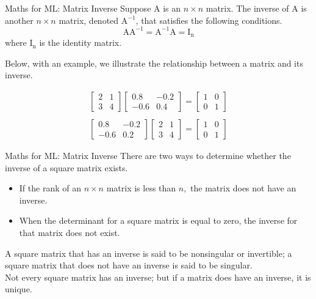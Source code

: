 \documentclass{beamer}
\begin{document}
\begin{frame}{Maths for ML: Matrix Inverse}
Suppose $\mathrm{A}$ is an $n \times n$ matrix. The inverse of $\mathrm{A}$ is another $n \times n$ matrix, denoted $\mathrm{A}^{-1}$, that satisfies the following conditions.
\[
\mathrm{AA}^{-1}=\mathrm{A}^{-1} \mathrm{A}=\mathrm{I}_{\mathrm{n}}
\]
\pause 
where $\mathrm{I}_{\mathrm{n}}$ is the identity matrix.

\pause  Below, with an example, we illustrate the relationship between a matrix and its inverse.

\pause \[
\begin{array}{l}
{\left[\begin{array}{cc}
	{2} & {1} \\
	{3} & {4}
	\end{array}\right]\left[\begin{array}{cc}
	{0.8} & {-0.2} \\
	{-0.6} & {0.4}
	\end{array}\right]=\left[\begin{array}{ll}
	{1} & {0} \\
	{0} & {1}
	\end{array}\right]} \\ \\
{\left[\begin{array}{cc}
	{0.8} & {-0.2} \\
	{-0.6} & {0.2}
	\end{array}\right]\left[\begin{array}{ll}
	{2} & {1} \\
	{3} & {4}
	\end{array}\right]=\left[\begin{array}{ll}
	{1} & {0} \\
	{0} & {1}
	\end{array}\right]}
\end{array}
\]

\end{frame}

\begin{frame}{Maths for ML: Matrix Inverse}
There are two ways to determine whether the inverse of a square matrix exists.

\pause 
\begin{itemize}[<+->]
	\item If the rank of an $n \times n$ matrix is less than $n,$ the matrix does not have an inverse.
	\item When the determinant for a square matrix is equal to zero, the inverse for that matrix does not exist.
\end{itemize}
\pause A square matrix that has an inverse is said to be nonsingular or invertible; a square matrix that does not have an inverse is said to be singular. \\
\pause Not every square matrix has an inverse; but if a matrix does have an inverse, it is unique.

\end{frame}
\end{document}
